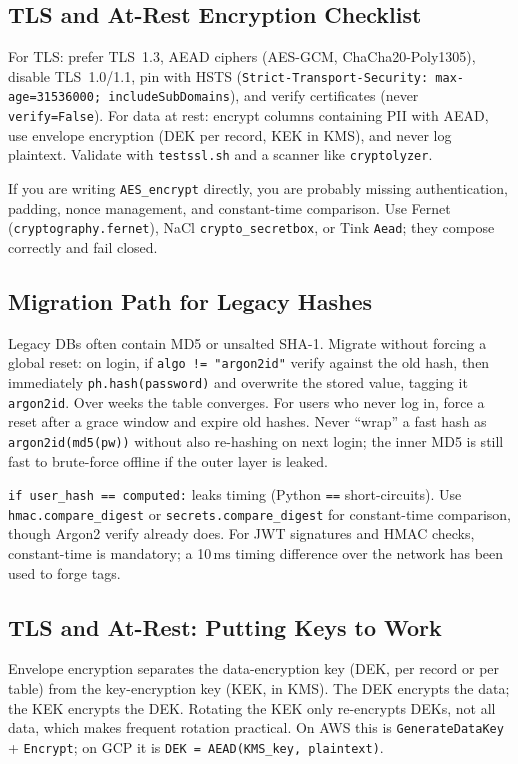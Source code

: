 \subsection{TLS and At-Rest Encryption Checklist}
For TLS: prefer TLS~1.3, AEAD ciphers (AES-GCM, ChaCha20-Poly1305), disable TLS~1.0/1.1, pin with HSTS (\texttt{Strict-Transport-Security: max-age=31536000; includeSubDomains}), and verify certificates (never \texttt{verify=False}). For data at rest: encrypt columns containing PII with AEAD, use envelope encryption (DEK per record, KEK in KMS), and never log plaintext. Validate with \texttt{testssl.sh} and a scanner like \texttt{cryptolyzer}.

\begin{remark}
If you are writing \texttt{AES\_encrypt} directly, you are probably missing authentication, padding, nonce management, and constant-time comparison. Use Fernet (\texttt{cryptography.fernet}), NaCl \texttt{crypto\_secretbox}, or Tink \texttt{Aead}; they compose correctly and fail closed.
\end{remark}

\subsection{Migration Path for Legacy Hashes}
Legacy DBs often contain MD5 or unsalted SHA-1. Migrate without forcing a global reset: on login, if \texttt{algo != "argon2id"} verify against the old hash, then immediately \texttt{ph.hash(password)} and overwrite the stored value, tagging it \texttt{argon2id}. Over weeks the table converges. For users who never log in, force a reset after a grace window and expire old hashes. Never ``wrap'' a fast hash as \texttt{argon2id(md5(pw))} without also re-hashing on next login; the inner MD5 is still fast to brute-force offline if the outer layer is leaked.

\begin{example}
\texttt{if user\_hash == computed:} leaks timing (Python \texttt{==} short-circuits). Use \texttt{hmac.compare\_digest} or \texttt{secrets.compare\_digest} for constant-time comparison, though Argon2 verify already does. For JWT signatures and HMAC checks, constant-time is mandatory; a 10\,ms timing difference over the network has been used to forge tags.
\end{example}

\subsection{TLS and At-Rest: Putting Keys to Work}
Envelope encryption separates the data-encryption key (DEK, per record or per table) from the key-encryption key (KEK, in KMS). The DEK encrypts the data; the KEK encrypts the DEK. Rotating the KEK only re-encrypts DEKs, not all data, which makes frequent rotation practical. On AWS this is \texttt{GenerateDataKey} + \texttt{Encrypt}; on GCP it is \texttt{DEK = AEAD(KMS\_key, plaintext)}.

